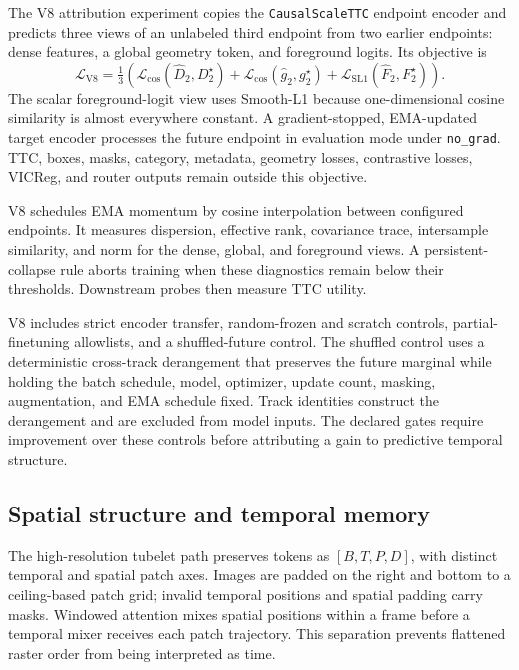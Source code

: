 The V8 attribution experiment copies the \texttt{CausalScaleTTC} endpoint encoder and predicts three views of an unlabeled third endpoint from two earlier endpoints: dense features, a global geometry token, and foreground logits. Its objective is
\begin{equation}
 \mathcal L_{\mathrm{V8}}=\tfrac13\left(
 \mathcal L_{\cos}(\widehat D_2,D_2^\star)
 +\mathcal L_{\cos}(\widehat g_2,g_2^\star)
 +\mathcal L_{\mathrm{SL1}}(\widehat F_2,F_2^\star)\right).
\end{equation}
The scalar foreground-logit view uses Smooth-L1 because one-dimensional cosine similarity is almost everywhere constant. A gradient-stopped, EMA-updated target encoder processes the future endpoint in evaluation mode under \texttt{no\_grad}. TTC, boxes, masks, category, metadata, geometry losses, contrastive losses, VICReg, and router outputs remain outside this objective. 

V8 schedules EMA momentum by cosine interpolation between configured endpoints. It measures dispersion, effective rank, covariance trace, intersample similarity, and norm for the dense, global, and foreground views. A persistent-collapse rule aborts training when these diagnostics remain below their thresholds. Downstream probes then measure TTC utility.

V8 includes strict encoder transfer, random-frozen and scratch controls, partial-finetuning allowlists, and a shuffled-future control. The shuffled control uses a deterministic cross-track derangement that preserves the future marginal while holding the batch schedule, model, optimizer, update count, masking, augmentation, and EMA schedule fixed. Track identities construct the derangement and are excluded from model inputs. The declared gates require improvement over these controls before attributing a gain to predictive temporal structure. 

\subsection{Spatial structure and temporal memory}
The high-resolution tubelet path preserves tokens as $[B,T,P,D]$, with distinct temporal and spatial patch axes. Images are padded on the right and bottom to a ceiling-based patch grid; invalid temporal positions and spatial padding carry masks. Windowed attention mixes spatial positions within a frame before a temporal mixer receives each patch trajectory. This separation prevents flattened raster order from being interpreted as time. 

